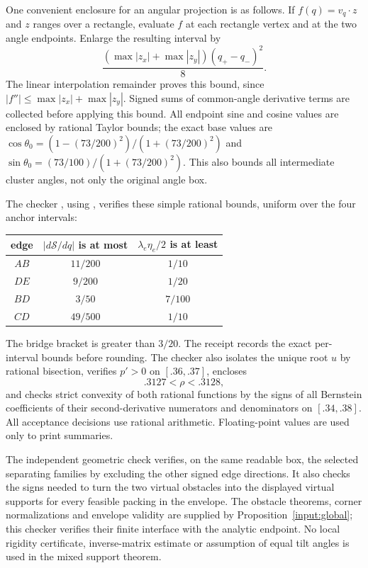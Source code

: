\documentclass[11pt]{article}
\begin{document}
One convenient enclosure for an angular projection is as follows. If
$f(q)=v_q\cdot z$ and $z$ ranges over a rectangle, evaluate $f$ at each
rectangle vertex and at the two angle endpoints. Enlarge the resulting
interval by
\[
 \frac{(\max|z_x|+\max|z_y|)(q_+-q_-)^2}{8}.
\]
The linear interpolation remainder proves this bound, since
$|f''|\le\max|z_x|+\max|z_y|$. Signed sums of common-angle derivative
terms are collected before applying this bound. All endpoint sine and
cosine values are enclosed by rational Taylor bounds; the exact base
values are $\cos\theta_0=(1-(73/200)^2)/(1+(73/200)^2)$ and
$\sin\theta_0=(73/100)/(1+(73/200)^2)$. This also bounds all intermediate
cluster angles, not only the original angle box.

The checker , using
, verifies these simple rational bounds,
uniform over the four anchor intervals:
\begin{center}
\begin{tabular}{c|c|c}
edge&$|d\mathcal S/dq|$ is at most&$\lambda_e\eta_e/2$ is at least\\ \hline
$AB$&$11/200$&$1/10$\\
$DE$&$9/200$&$1/20$\\
$BD$&$3/50$&$7/100$\\
$CD$&$49/500$&$1/10$
\end{tabular}
\end{center}
The bridge bracket is greater than $3/20$. The receipt
 records the exact
per-interval bounds before rounding. The checker also
isolates the unique root $u$ by rational bisection, verifies $p'>0$ on
$[.36,.37]$, encloses
\[
 .3127<\rho<.3128,
\]
and checks strict convexity of both rational functions by the signs of
all Bernstein coefficients of their second-derivative numerators and
denominators on $[.34,.38]$. All acceptance decisions use rational
arithmetic. Floating-point values are used only to print summaries.

The independent geometric check
 verifies, on the same readable
box, the selected separating families by excluding the other signed
edge directions. It also checks the signs needed to turn the two
virtual obstacles into the displayed virtual supports for every feasible
packing in the envelope. The obstacle theorems, corner normalizations
and envelope validity are supplied by Proposition~\ref{input:global};
this checker verifies their finite interface with the analytic endpoint.
No local rigidity certificate, inverse-matrix estimate or assumption of
equal tilt angles is used in the mixed support theorem.
\end{document}
